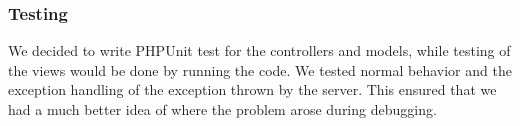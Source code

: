 \subsubsection{Testing}
We decided to write PHPUnit test for the controllers and models, while testing of the views would be done by running the code. We tested normal behavior and the exception handling of the exception thrown by the server. This ensured that we had a much better idea of where the problem arose during debugging.